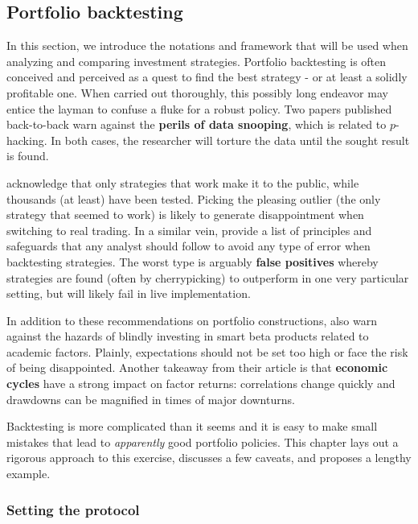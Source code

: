 \subsection{Portfolio backtesting}

In this section, we introduce the notations and framework that will be used when analyzing and comparing investment strategies. Portfolio backtesting is often conceived and perceived as a quest to find the best strategy - or at least a solidly profitable one. When carried out thoroughly, this possibly long endeavor may entice the layman to confuse a fluke for a robust policy. Two papers published back-to-back warn against the \textbf{perils of data snooping}, which is related to $p$-hacking. In both cases, the researcher will torture the data until the sought result is found.

\cite{fabozzi2018being} acknowledge that only strategies that work make it to the public, while thousands (at least) have been tested. Picking the pleasing outlier (the only strategy that seemed to work) is likely to generate disappointment when switching to real trading. In a similar vein, \cite{arnott2019backtesting} provide a list of principles and safeguards that any analyst should follow to avoid any type of error when backtesting strategies. The worst type is arguably \textbf{false positives} whereby strategies are found (often by cherrypicking) to outperform in one very particular setting, but will likely fail in live implementation.

In addition to these recommendations on portfolio constructions, \cite{arnott2019alice} also warn against the hazards of blindly investing in smart beta products related to academic factors. Plainly, expectations should not be set too high or face the risk of being disappointed. Another takeaway from their article is that \textbf{economic cycles} have a strong impact on factor returns: correlations change quickly and drawdowns can be magnified in times of major downturns.

Backtesting is more complicated than it seems and it is easy to make small mistakes that lead to \textit{apparently} good portfolio policies. This chapter lays out a rigorous approach to this exercise, discusses a few caveats, and proposes a lengthy example.

\subsubsection{Setting the protocol}

